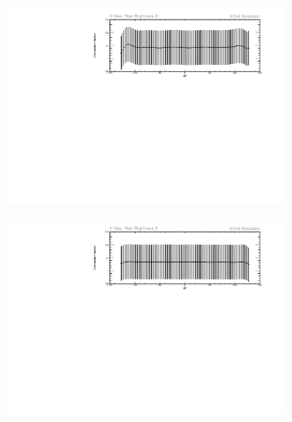 \begin{figure}[hbtp]
\centering
\begin{subfigure}[t]{0.9\textwidth}
\centering
\includegraphics[width=\textwidth]{PlotsTBCalibTechnote/ThresholdCorrectionExample_axview_fb0_P4DataBasedSim.pdf}
\end{subfigure}
\begin{subfigure}[b]{0.9\textwidth}
\centering
\includegraphics[width=\textwidth]{PlotsTBCalibTechnote/ThresholdCorrectionExample_ayview_fb5_P4DataBasedSim.pdf}
\end{subfigure}
\begin{subfigure}[t]{0.9\textwidth}
\centering

\end{subfigure}
\end{figure}

